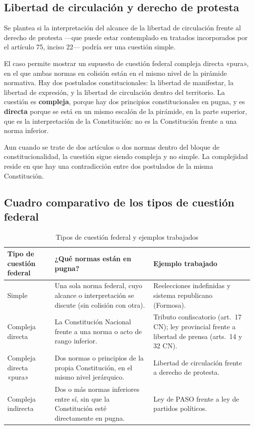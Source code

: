 \documentclass[12pt,oneside]{book}
\begin{document}
\subsection{Libertad de circulación y derecho de protesta}

Se plantea si la interpretación del alcance de la libertad de circulación frente al derecho de protesta —que puede estar contemplado en tratados incorporados por el artículo 75, inciso 22— podría ser una cuestión simple.

El caso permite mostrar un supuesto de cuestión federal compleja directa «pura», en el que ambas normas en colisión están en el mismo nivel de la pirámide normativa. Hay dos postulados constitucionales: la libertad de manifestar, la libertad de expresión, y la libertad de circulación dentro del territorio. La cuestión es \textbf{compleja}, porque hay dos principios constitucionales en pugna, y es \textbf{directa} porque se está en un mismo escalón de la pirámide, en la parte superior, que es la interpretación de la Constitución: no es la Constitución frente a una norma inferior.

Aun cuando se trate de dos artículos o dos normas dentro del bloque de constitucionalidad, la cuestión sigue siendo compleja y no simple. La complejidad reside en que hay una contradicción entre dos postulados de la misma Constitución.

\subsection{Cuadro comparativo de los tipos de cuestión federal}

\begin{table}[H]
\centering
\caption{Tipos de cuestión federal y ejemplos trabajados}
\renewcommand{\arraystretch}{1.2}
\begin{tabularx}{\textwidth}{
    >{\raggedright\arraybackslash}p{}
    >{\raggedright\arraybackslash}X
    >{\raggedright\arraybackslash}X
}
\toprule
\textbf{Tipo de cuestión federal} &
\textbf{¿Qué normas están en pugna?} &
\textbf{Ejemplo trabajado} \\
\midrule
Simple &
Una sola norma federal, cuyo alcance o interpretación se discute (sin colisión con otra). &
Reelecciones indefinidas y sistema republicano (Formosa). \\
\addlinespace
Compleja directa &
La Constitución Nacional frente a una norma o acto de rango inferior. &
Tributo confiscatorio (art.~17 CN); ley provincial frente a libertad de prensa (arts.~14 y 32 CN). \\
\addlinespace
Compleja directa «pura» &
Dos normas o principios de la propia Constitución, en el mismo nivel jerárquico. &
Libertad de circulación frente a derecho de protesta. \\
\addlinespace
Compleja indirecta &
Dos o más normas inferiores entre sí, sin que la Constitución esté directamente en pugna. &
Ley de PASO frente a ley de partidos políticos. \\
\bottomrule
\end{tabularx}
\end{table}
\end{document}
